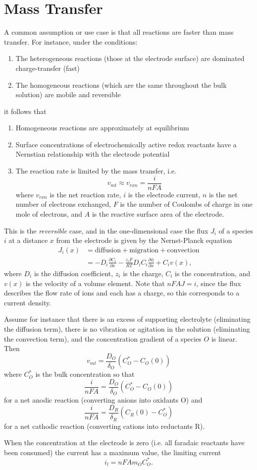 \section{Mass Transfer}

A common assumption or use case is that all reactions are faster
than mass transfer. For instance, under the conditions:
\begin{enumerate}
  \item{
    The heterogeneous reactions (those at the electrode surface)
    are dominated charge-transfer (fast)
  }
  \item{
    The homogeneous reactions (which are the same throughout the
    bulk solution) are mobile and reversible
  }
\end{enumerate}
it follows that
\begin{enumerate}
  \item{
    Homogeneous reactions are approximately at equilibrium
  }
  \item{
    Surface concentrations of electrochemically active redox
    reactants have a Nernstian relationship with the electrode potential
  }
  \item{
    The reaction rate is limited by the mass transfer, i.e.
    $$
    v_{mt} \approx v_{rxn} = \frac{i}{nFA}
    $$
    where $v_{rxn}$ is the net reaction rate, $i$ is the electrode current,
    $n$ is the net number of electrons exchanged, $F$ is the number of
    Coulombs of charge in one mole of electrons, and $A$ is the reactive
    surface area of the electrode.
  }
\end{enumerate}

This is the \emph{reversible} case, and in the one-dimensional case the
flux $J_i$ of a species $i$ at a distance $x$ from the electrode is given by
the Nernst-Planck equation
\begin{align*}
J_i(x) &= \text{diffusion} + \text{migration} + \text{convection} \\
       &= -D_i \frac{\partial C_i}{\partial x}
          -\frac{z_i F}{RT} D_i C_i \frac{\partial \phi}{\partial x}
          +C_i v(x),
\end{align*}
where $D_i$ is the diffusion coefficient, $z_i$ is the charge, $C_i$ is
the concentration, and $v(x)$ is the velocity of a volume element.
Note that $n F A J = i$, since the flux describes the flow rate of
ions and each has a charge, so this corresponds to a current density.

Assume for instance that there is an excess of supporting electrolyte
(eliminating the diffusion term), there is no vibration or agitation in
the solution (eliminating the convection term), and the concentration
gradient of a species $O$ is linear. Then
$$
v_{mt} = \frac{D_O}{\delta_O}(C_O^\ast - C_O(0))
$$
where $C_O^\ast$ is the bulk concentration so that
$$
\frac{i}{nFA} = \frac{D_O}{\delta_O}(C_O^\ast - C_O(0))
$$
for a net anodic reaction (converting anions into oxidants O) and
$$
\frac{i}{nFA} = \frac{D_R}{\delta_R}(C_R(0) - C_O^\ast)
$$
for a net cathodic reaction (converting cations into reductants R).

When the concentration at the electrode is zero (i.e. all
faradaic reactants have been consumed) the current has a maximum
value, the limiting current
$$
i_l = n F A m_O C_O^\ast.
$$
